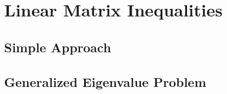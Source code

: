 \chapter{Linear Matrix Inequalities} 
     \section{Simple Approach}
     
     \section{Generalized Eigenvalue Problem}
